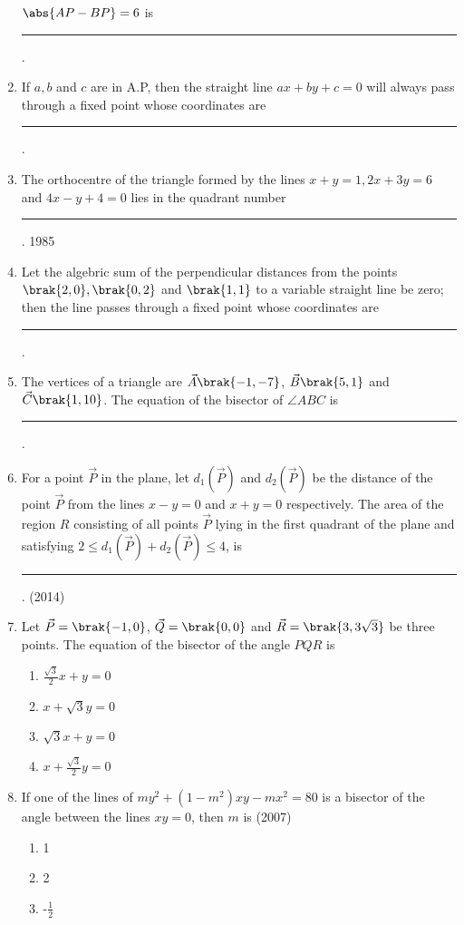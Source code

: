 \begin{enumerate}[label=\thesubsection.\arabic*.,ref=\thesubsection.\theenumi]
    $\abs{AP-BP}=6$ is \rule{1cm}{0.01pt}.
    \hfill{}
    \item If $a,b$ and $c$ are in A.P, then the straight line $ax +by +c=0$ will always pass through a fixed point whose coordinates are \rule{1cm}{0.01pt}.
    \hfill{}
    \item The orthocentre of the triangle formed by the lines $x+y=1, 2x +3y=6$ and $4x-y+4=0$ lies in the quadrant number \rule{1cm}{0.01pt}.
    \hfill{1985}
    \item Let the algebric sum of the perpendicular distances from the points $\brak{2,0},\brak{0,2}$ and $\brak{1,1}$ to a variable straight line be zero; then the line passes through a fixed point whose coordinates are \rule{1cm}{0.01pt}.
    \hfill{}
    \item The vertices of a triangle are $\vec{A}\brak{-1,-7}$, $\vec{B}\brak{5,1}$ and $\vec{C}\brak{1,10}$. The equation of the bisector of $\angle{ABC}$ is \rule{1cm}{0.01pt}.
    \hfill{}
	\item For a point $\vec{P}$ in the plane, let $d_{1}(\vec{P})$ and $d_{2}(\vec{P})$ be the 
		distance of the point $\vec{P}$ from the lines $x-y=0$ and $x+y =0$ 
respectively. The area of the region $R$ consisting of all points 
		$\vec{P}$ lying in the first quadrant of the plane and satisfying
$2\leq d_{1}(\vec{P})+d_{2}(\vec{P}) \leq4$, is \rule{1cm}{0.01pt}.
		\hfill{(2014)}
	\item Let $\vec{P}=\brak{-1, 0}$, $\vec{Q}=\brak{0, 0}$ and $\vec{R}=\brak{3, 3\sqrt{3}}$ be three points. The equation of the bisector of the angle $PQR$ is \hfill{}
\begin{multicols}{4}
\begin{enumerate}
\item $\frac{\sqrt{3}}{2}x+y=0$
\item $x+\sqrt{3}y=0$
\item $\sqrt{3}x+y=0$
\item $x+\frac{\sqrt{3}}{2}y=0$
\end{enumerate}
\end{multicols}
\item If one of the lines of $my^{2}+(1-m^{2})xy-mx^{2}=80$ is a bisector 
of the angle between the lines $xy=0$, then $m$ is
\hfill{(2007)}
\begin{multicols}{4}
\begin{enumerate}
\item 1
\item 2
\item -$\frac{1}{2}$

\end{enumerate}
\end{multicols}
\end{enumerate}

